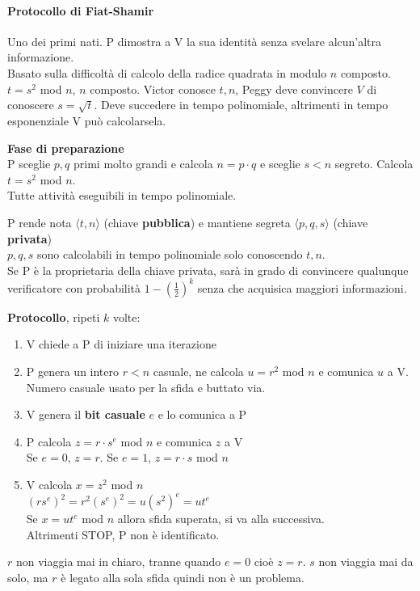 \documentclass[10pt]{book}
\begin{document}
\paragraph{Protocollo di Fiat-Shamir} Uno dei primi nati. P dimostra a V la sua identità senza svelare alcun'altra informazione.\\
Basato sulla difficoltà di calcolo della radice quadrata in modulo $n$ composto.\\
$t = s^2$ mod $n$, $n$ composto. Victor conosce $t,n$, Peggy deve convincere $V$ di conoscere $s = \sqrt{t}$. Deve succedere in tempo polinomiale, altrimenti in tempo esponenziale V può calcolarsela.
\begin{list}{}{}
	\item \textbf{Fase di preparazione}\\
	P sceglie $p,q$ primi molto grandi e calcola $n = p\cdot q$ e sceglie $s < n$ segreto. Calcola $t = s^2$ mod $n$.\\
	Tutte attività eseguibili in tempo polinomiale.
	\item P rende nota $\langle t,n\rangle$ (chiave \textbf{pubblica}) e mantiene segreta $\langle p,q,s\rangle$ (chiave \textbf{privata})\\
	$p,q,s$ sono calcolabili in tempo polinomiale solo conoscendo $t,n$.\\
	Se P è la proprietaria della chiave privata, sarà in grado di convincere qualunque verificatore con probabilità $1-\left(\frac{1}{2}\right)^k$ senza che acquisica maggiori informazioni.
	\item \textbf{Protocollo}, ripeti $k$ volte:
	\begin{enumerate}
		\item V chiede a P di iniziare una iterazione
		\item P genera un intero $r<n$ casuale, ne calcola $u = r^2$ mod $n$ e comunica $u$ a V.
		Numero casuale usato per la sfida e buttato via.
		\item V genera il \textbf{bit casuale} $e$ e lo comunica a P
		\item P calcola $z = r\cdot s^e$ mod $n$ e comunica $z$ a V\\
Se $e = 0$, $z = r$. Se $e = 1$, $z = r\cdot s$ mod $n$
		\item V	calcola $x = z^2$ mod $n$\\
		$(rs^e)^2 = r^2(s^e)^2 = u(s^2)^e = ut^e$\\
		Se $x = ut^e$ mod $n$ allora sfida superata, si va alla successiva.\\
		Altrimenti STOP, P non è identificato.
	\end{enumerate}
	$r$ non viaggia mai in chiaro, tranne quando $e=0$ cioè $z=r$. $s$ non viaggia mai da solo, ma $r$ è legato alla sola sfida quindi non è un problema.
\end{list}
\end{document}
